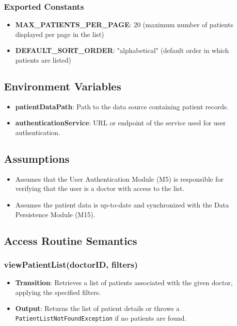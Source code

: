 \documentclass[12pt, titlepage]{article}
\begin{document}
\subsubsection{Exported Constants}
\begin{itemize}
\item \textbf{MAX\_PATIENTS\_PER\_PAGE}: 20 (maximum number of patients displayed per page in the list)
\item \textbf{DEFAULT\_SORT\_ORDER}: "alphabetical" (default order in which patients are listed)
\end{itemize}

\subsection{Environment Variables}
\begin{itemize}
\item \textbf{patientDataPath}: Path to the data source containing patient records.
\item \textbf{authenticationService}: URL or endpoint of the service used for user authentication.
\end{itemize}

\subsection{Assumptions}
\begin{itemize}
\item Assumes that the User Authentication Module (M5) is responsible for verifying that the user is a doctor with access to the list.
\item Assumes the patient data is up-to-date and synchronized with the Data Persistence Module (M15).
\end{itemize}

\subsection{Access Routine Semantics}
\subsubsection{viewPatientList(doctorID, filters)}

\begin{itemize}
    \item \textbf{Transition}: Retrieves a list of patients associated with the given doctor, applying the specified filters.
    \item \textbf{Output}: Returns the list of patient details or throws a \texttt{PatientListNotFoundException} if no patients are found.
\end{itemize}
\end{document}
